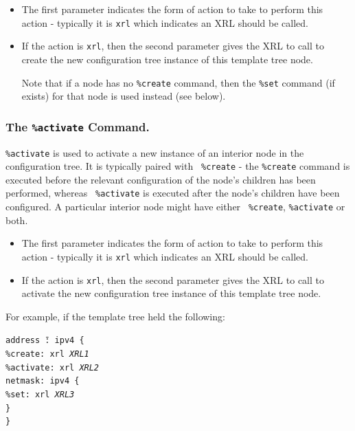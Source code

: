 \documentclass[11pt]{article}
\begin{document}
\begin{itemize}

  \item The first parameter indicates the form of
action to take to perform this action - typically it is {\tt xrl}
which indicates an XRL should be called.

  \item If the action is {\tt xrl}, then the second parameter gives the XRL to
call to create the new configuration tree instance of this template
tree node.

Note that if a node has no {\tt \%create} command, then the {\tt \%set}
command (if exists) for that node is used instead (see below).

\end{itemize}

\subsubsection{The {\tt \%activate} Command.}
{\tt \%activate} is used to activate a new instance of an interior
node in the configuration tree.  It is typically paired with {\tt
\%create} - the {\tt \%create} command is executed before the relevant
configuration of the node's children has been performed, whereas {\tt
\%activate} is executed after the node's children have been
configured.  A particular interior node might have either {\tt
\%create}, {\tt \%activate} or both.

\begin{itemize}

  \item The first parameter indicates the form of action to take to perform
this action - typically it is {\tt xrl} which indicates an XRL should
be called.

  \item If the action is {\tt xrl}, then the second parameter gives the XRL to
call to activate the new configuration tree instance of this template
tree node.

\end{itemize}

For example, if the template tree held the following:

\begin{tabbing}
\tt addr\=\tt ess \=\tt@: ipv4 \{\\
    \>\tt\%create: xrl {\it XRL1}\\
    \>\tt\%activate: xrl {\it XRL2}\\
    \>\tt netmask: ipv4 \{\\
        \>\>\tt\%set: xrl {\it XRL3}\\
    \>\tt\}\\
\tt\}
\end{tabbing}
\end{document}
